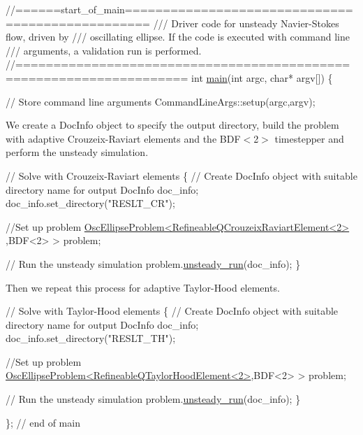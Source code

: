 \begin{DoxyCodeInclude}
\textcolor{comment}{//======start\_of\_main=================================================}
\textcolor{comment}{/// Driver code for unsteady Navier-Stokes flow, driven by}
\textcolor{comment}{}\textcolor{comment}{/// oscillating ellipse. If the code is executed with command line}
\textcolor{comment}{}\textcolor{comment}{/// arguments, a validation run is performed. }
\textcolor{comment}{}\textcolor{comment}{//====================================================================}
\textcolor{keywordtype}{int} \hyperlink{osc__quarter__ellipse_8cc_a0ddf1224851353fc92bfbff6f499fa97}{main}(\textcolor{keywordtype}{int} argc, \textcolor{keywordtype}{char}* argv[])
\{

 \textcolor{comment}{// Store command line arguments}
 CommandLineArgs::setup(argc,argv);

\end{DoxyCodeInclude}


We create a {\ttfamily Doc\+Info} object to specify the output directory, build the problem with adaptive Crouzeix-\/\+Raviart elements and the {\ttfamily B\+D\+F$<$2$>$} timestepper and perform the unsteady simulation.


\begin{DoxyCodeInclude}


 \textcolor{comment}{// Solve with Crouzeix-Raviart elements}
 \{
  \textcolor{comment}{// Create DocInfo object with suitable directory name for output}
  DocInfo doc\_info;
  doc\_info.set\_directory(\textcolor{stringliteral}{"RESLT\_CR"});
  
  \textcolor{comment}{//Set up problem}
  \hyperlink{classOscEllipseProblem}{OscEllipseProblem<RefineableQCrouzeixRaviartElement<2>}
      ,BDF<2> > problem;
  
  \textcolor{comment}{// Run the unsteady simulation}
  problem.\hyperlink{classOscEllipseProblem_ad0d879edbbd8b09b61e802ab66ef98a3}{unsteady\_run}(doc\_info);
 \}

\end{DoxyCodeInclude}


Then we repeat this process for adaptive Taylor-\/\+Hood elements.


\begin{DoxyCodeInclude}

 \textcolor{comment}{// Solve with Taylor-Hood elements}
 \{
  \textcolor{comment}{// Create DocInfo object with suitable directory name for output}
  DocInfo doc\_info;
  doc\_info.set\_directory(\textcolor{stringliteral}{"RESLT\_TH"});

  \textcolor{comment}{//Set up problem}
  \hyperlink{classOscEllipseProblem}{OscEllipseProblem<RefineableQTaylorHoodElement<2>},BDF<2>
       > problem;
  
  \textcolor{comment}{// Run the unsteady simulation}
  problem.\hyperlink{classOscEllipseProblem_ad0d879edbbd8b09b61e802ab66ef98a3}{unsteady\_run}(doc\_info);
 \}
 

\}; \textcolor{comment}{// end of main}

\end{DoxyCodeInclude}




